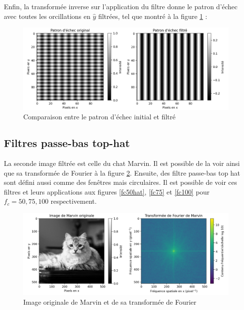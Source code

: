 \documentclass[11pt,letterpaper]{article}
\begin{document}
Enfin, la transformée inverse sur l'application du filtre donne le patron d'échec avec toutes les orcillations en $\hat{y}$ filtrées, tel que montré à la figure \ref{echec_comp} :

\begin{figure}[H]
  \centering
  \includegraphics[scale=0.68]{check_filtre.png}
  \caption{Comparaison entre le patron d'échec initial et filtré}
  \label{echec_comp}
\end{figure}

\subsection{Filtres passe-bas top-hat}

La seconde image filtrée est celle du chat Marvin. Il est possible de la voir ainsi que sa transformée de Fourier à la figure \ref{cat_og}. Ensuite, des filtre passe-bas top hat sont défini aussi comme des fenêtres mais circulaires. Il est possible de voir ces filtres et leurs applications aux figures \ref{fc50hat}, \ref{fc75} et \ref{fc100} pour $f_c = 50, 75,100$ respectivement.

\begin{figure}[H]
  \centering
  \includegraphics[scale=0.68]{marvin_og.png}
  \caption{Image originale de Marvin et de sa transformée de Fourier}
  \label{cat_og}
\end{figure}
\end{document}
